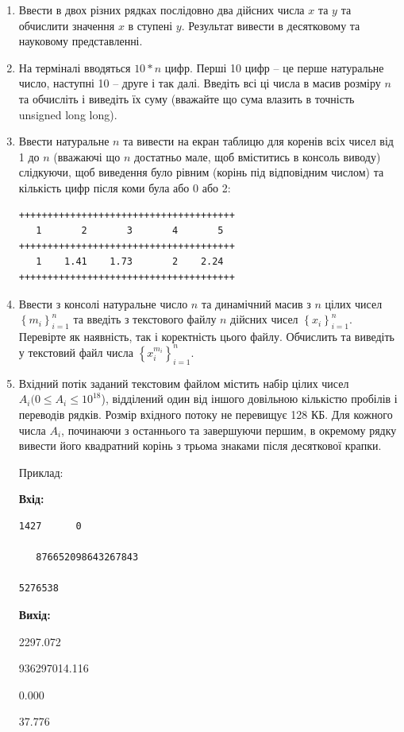 \documentclass[a5paper,titlepage,openany,twoside,draft]{book_unv}%
\begin{document}
\begin{enumerate}
\def\labelenumi{\arabic{enumi})}
\item
  Ввести в двох різних рядках послідовно два дійсних числа $x$ та $y$ та
  обчислити значення $x$ в ступені $y$. Результат вивести в десятковому та
  науковому представленні.
\item
  На терміналі вводяться $10*n$ цифр. Перші 10 цифр -- це перше натуральне
  число, наступні 10 -- друге і так далі. Введіть всі ці числа в масив
  розміру $n$ та обчисліть і виведіть їх суму (вважайте що сума влазить в
  точність unsigned long long).
\item
  Ввести натуральне $n$ та вивести на екран таблицю для коренів 
 всіх чисел від 1 до $n$ (вважаючі що $n$ достатньо мале, щоб вміститись в 
 консоль виводу) слідкуючи, щоб виведення було рівним (корінь під відповідним числом)
 та кількість цифр після коми була або 0 або 2:
\begin{verbatim}
++++++++++++++++++++++++++++++++++++++
   1       2       3       4       5 
++++++++++++++++++++++++++++++++++++++
   1    1.41    1.73       2    2.24 
++++++++++++++++++++++++++++++++++++++
\end{verbatim}
\item
  Ввести з консолі натуральне число $n$ та динамічний масив з
  $n$ цілих чисел \(\left\{ m_{i} \right\}_{i = 1}^{n}\) та введіть з 
текстового файлу $n$ дійсних чисел  \(\left\{ x_{i} \right\}_{i = 1}^{n}\).
 Перевірте як наявність, так і коректність цього файлу.
 Обчислить та виведіть у текстовий файл
  числа \(\left\{ x_{i}^{m_{i}} \right\}_{i = 1}^{n}\).
\item
  Вхідний потік заданий текстовим файлом містить набір цілих чисел $A_i (0
  \le A_i \le 10^{18}$), відділений один від іншого довільною кількістю пробілів
  і переводів рядків. Розмір вхідного потоку не перевищує 128 КБ. Для
  кожного числа $A_i$, починаючи з останнього та завершуючи першим, в
  окремому рядку вивести його квадратний корінь з трьома
  знаками після десяткової крапки.

Приклад:

\textbf{Вхід:}
\begin{verbatim}
1427      0

   876652098643267843

5276538
\end{verbatim}
\textbf{Вихід: }

2297.072

936297014.116

0.000

37.776

\end{enumerate}
\end{document}
